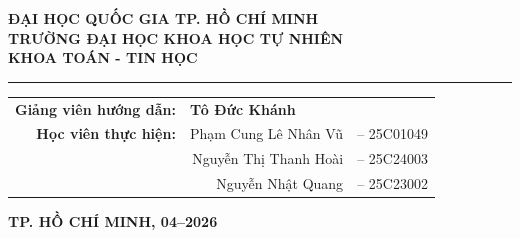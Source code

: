 \documentclass[a4paper]{article}
\begin{document}
\begin{titlepage}
    \begin{center}
        {\large \textbf{ĐẠI HỌC QUỐC GIA TP. HỒ CHÍ MINH}} \\
        {\large \textbf{TRƯỜNG ĐẠI HỌC KHOA HỌC TỰ NHIÊN}} \\
        {\large \textbf{KHOA TOÁN - TIN HỌC}} \\
        
        \vspace{0.5cm}
        \hrule
        \vspace{2.5cm}
        
       
        
        \vspace{1.5cm}
        
        
        \vspace{3cm}
        
        \begin{table}[h]
            \centering
            \begin{tabular}{rrl}
                \textbf{Giảng viên hướng dẫn:} & \multicolumn{2}{l}{\textbf{Tô Đức Khánh}} \\[0.3cm]
                \textbf{Học viên thực hiện:}  & Phạm Cung Lê Nhân Vũ   & -- 25C01049 \\
                                              & Nguyễn Thị Thanh Hoài  & -- 25C24003\\
                                              & Nguyễn Nhật Quang      & -- 25C23002 \\
            \end{tabular}
        \end{table}
        
        \vfill

        {\large \textbf{TP. HỒ CHÍ MINH, 04--2026}}
        
    \end{center}
\end{titlepage}
\end{document}
